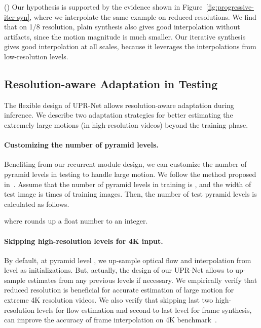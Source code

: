\documentclass[10pt,twocolumn,letterpaper]{article}
\begin{document}
() Our hypothesis is supported by the evidence shown in
Figure~\ref{fig:progressive-iter-syn}, where we interpolate the same example on
reduced resolutions. We find that on 1/8 resolution, plain synthesis also gives
good interpolation without artifacts, since the motion magnitude is much
smaller. Our iterative synthesis gives good interpolation at all scales, because
it leverages the interpolations from low-resolution levels.


\subsection{Resolution-aware Adaptation in Testing}
The flexible design of UPR-Net allows resolution-aware adaptation during
inference. We describe two adaptation strategies for better estimating the
extremely large motions (in high-resolution videos) beyond the training phase.


\paragraph{Customizing the number of pyramid levels.}\label{para:pyr-lvls}
Benefiting from our recurrent module design, we can customize the number of
pyramid levels in testing to handle large motion. We follow the method proposed
in~\cite{jin2022enhanced}.  Assume that the number of pyramid levels in training
is , and the width of test image is  times of training images.
Then, the number of test pyramid levels is calculated as follows.


where  rounds up a float number to an integer.


\paragraph{Skipping high-resolution levels for 4K input.} By default, at pyramid
level , we up-sample optical flow and interpolation from level  as
initializations.  But, actually, the design of our UPR-Net allows to up-sample
estimates from any previous levels if necessary.  We empirically verify that
reduced resolution is beneficial for accurate estimation of large motion for
extreme 4K resolution videos. We also verify that skipping last two
high-resolution levels for flow estimation and second-to-last level for frame
synthesis, can improve the accuracy of frame interpolation on 4K
benchmark~\cite{sim2021xvfi}.
\end{document}
